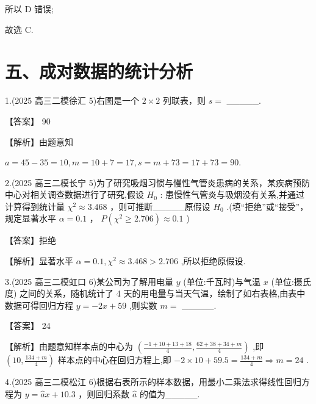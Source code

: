 \documentclass[10pt]{article}
\begin{document}
所以 D 错误;

故选 C.

\section*{五、成对数据的统计分析}

1.(2025 高三二模徐汇 5)右图是一个 \(2 \times  2\) 列联表，则 \(s =\) \_\_\_\_\_.

【答案】 90

【解析】由题意知

\(a = {45} - {35} = {10},m = {10} + 7 = {17},s = m + {73} = {17} + {73} = {90}.\)

2.(2025 高三二模长宁 5)为了研究吸烟习惯与慢性气管炎患病的关系，某疾病预防中心对相关调查数据进行了研究,假设 \({H}_{0}\) : 患慢性气管炎与吸烟没有关系,并通过计算得到统计量 \({\chi }^{2} \approx  {3.468}\) ，则可推断\_\_\_\_\_原假设 \({H}_{0}\) .(填“拒绝”或“接受”，规定显著水平 \(\alpha  = {0.1}\) ， \(P\left( {{\chi }^{2} \geq  {2.706}}\right)  \approx  {0.1}\) )

【答案】拒绝

【解析】显著水平 \(\alpha  = {0.1},{\chi }^{2} \approx  {3.468} > {2.706}\) ,所以拒绝原假设.

3.(2025 高三二模虹口 6)某公司为了解用电量 \(y\) (单位:千瓦时)与气温 \(x\) (单位:摄氏度) 之间的关系，随机统计了 4 天的用电量与当天气温，绘制了如右表格,由表中数据可得回归方程 \(y =  - {2x} + {59}\) ,则实数 \(m =\) \_\_\_\_\_.

\begin{center}
\end{center}

【答案】 24

【解析】由题意知样本点的中心为 \(\left( {\frac{-1 + {10} + {13} + {18}}{4},\frac{{62} + {38} + {34} + m}{4}}\right)\) ,即 \(\left( {{10},\frac{{134} + m}{4}}\right)\) 样本点的中心在回归方程上,即 \(- 2 \times  {10} + {59.5} = \frac{{134} + m}{4} \Rightarrow  m = {24}\) .

4.(2025 高三二模松江 6)根据右表所示的样本数据，用最小二乘法求得线性回归方程为 \(y = \widehat{a}x + {10.3}\) ，则回归系数 \(\widehat{a}\) 的值为\_\_\_\_\_.

\begin{center}
\end{center}
\end{document}
